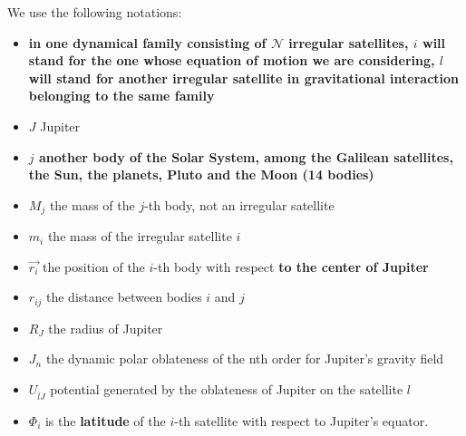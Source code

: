 \documentclass[useAMS,usenatbib]{mn2e}
\begin{document}
We use the following notations: \begin{itemize}
\item \textbf{in one dynamical family consisting of $\mathcal{N}$ irregular satellites, $i$ will stand for the one whose equation of motion we are considering, $l$ will stand for another irregular satellite in gravitational interaction belonging to the same family}
\item $J$ Jupiter
\item \textbf{$j$ another body of the Solar System, among the Galilean satellites, the Sun, the planets, Pluto and the Moon (14 bodies)}
\item $M_j$ the mass of the $j$-th body, not an irregular satellite
\item $m_i$ the mass of the irregular satellite $i$
\item $\vec{r_i}$ the position of the $i$-th body with respect \textbf{to the center of Jupiter}
\item $r_{ij}$ the distance between bodies $i$ and $j$
\item $R_J$ the radius of Jupiter
\item $J_n$ the dynamic polar oblateness of the nth order for Jupiter's gravity field
\item $U_{\bar{l}\hat{J}}$ potential generated by the oblateness of Jupiter on the satellite $l$
\item $\Phi_i$ is the \textbf{latitude} of the $i$-th satellite with respect to Jupiter's equator.
\end{itemize}
\end{document}

